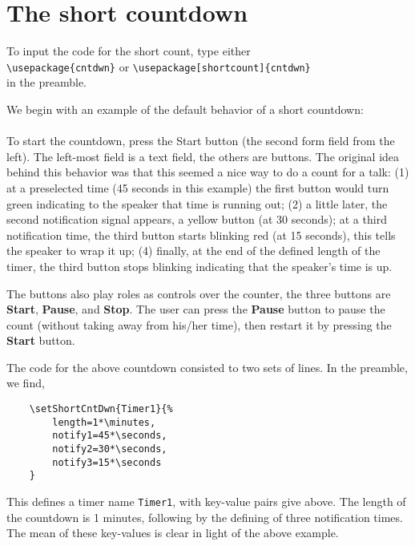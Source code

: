 \documentclass{article}
\begin{document}
\section{The short countdown}\label{s:short}

To input the code for the short count, type either\\[6pt]
\hspace*{20pt}\verb!\usepackage{cntdwn}! or
\verb!\usepackage[shortcount]{cntdwn}!\\[6pt]
in the preamble.

We begin with an example of the default behavior of a short countdown:\\[6pt]
\hspace*{20pt}
\\[6pt]
To start the countdown, press the Start button (the second form field from
the left). The left-most field is a text field, the others are buttons.
The original idea behind this behavior was that this seemed a nice way to
do a count for a talk: (1) at a preselected time (45 seconds in this
example) the first button would turn green indicating to the speaker that
time is running out; (2) a little later, the second notification signal
appears, a yellow button (at 30 seconds); at a third notification time,
the third button starts blinking red (at 15 seconds), this tells the
speaker to wrap it up; (4) finally, at the end of the defined length of
the timer, the third button stops blinking indicating that the speaker's
time is up.

The buttons also play roles as controls over the counter, the three
buttons are \textbf{Start}, \textbf{Pause}, and \textbf{Stop}.  The user can press the \textbf{Pause} button to
pause the count (without taking away from his/her time), then restart it
by pressing the \textbf{Start} button.

The code for the above countdown consisted to two sets of lines. In the
preamble, we find,
\begin{verbatim}
    \setShortCntDwn{Timer1}{%
        length=1*\minutes,
        notify1=45*\seconds,
        notify2=30*\seconds,
        notify3=15*\seconds
    }
\end{verbatim}
This defines a timer name \texttt{Timer1}, with key-value pairs give
above. The length of the countdown is 1 minutes, following by the
defining of three notification times. The mean of these key-values is
clear in light of the above example.
\end{document}
